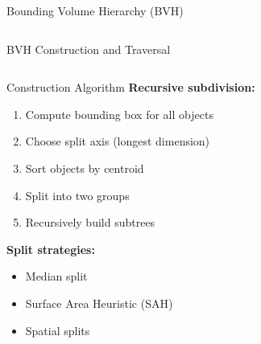 \begin{frame}{Bounding Volume Hierarchy (BVH)}
\begin{columns}
\begin{column}{0.5\textwidth}
        \end{column}
    \end{columns}
\end{frame}

\begin{frame}{BVH Construction and Traversal}
    \begin{columns}
        \begin{column}{0.5\textwidth}
            \begin{mathbox}{Construction Algorithm}
                \textbf{Recursive subdivision:}
                \begin{enumerate}
                    \item Compute bounding box for all objects
                    \item Choose split axis (longest dimension)
                    \item Sort objects by centroid
                    \item Split into two groups
                    \item Recursively build subtrees
                \end{enumerate}
                
                \vspace{0.3cm}
                \textbf{Split strategies:}
                \begin{itemize}
                    \item Median split
                    \item Surface Area Heuristic (SAH)
                    \item Spatial splits
                \end{itemize}
            \end{mathbox}
        \end{column}
        \begin{column}{0.5\textwidth}
\end{column}
\end{columns}
\end{frame}
